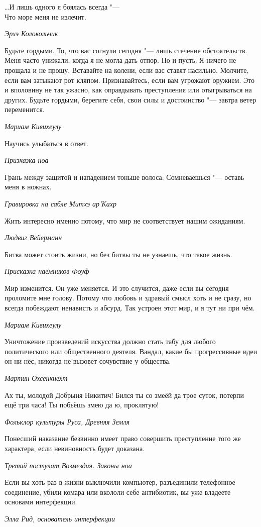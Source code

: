 \documentclass[a4paper,10pt,fleqn]{book}
\newcommand{\mulang}[3]{#2}%
\begin{document}
\epigraph{\dots И лишь одного я боялась всегда "---\\
Что море меня не излечит.}
{\textit{Эрхэ Колокольчик}}

\epigraph{Будьте гордыми.
То, что вас согнули сегодня "--- лишь стечение обстоятельств.
Меня часто унижали, когда я не могла дать отпор.
Но и пусть.
Я ничего не прощала и не прощу.
Вставайте на колени, если вас ставят насильно.
Молчите, если вам затыкают рот кляпом.
Признавайтесь, если вам угрожают оружием.
Это и вполовину не так ужасно, как оправдывать преступления или отыгрываться на других.
Будьте гордыми, берегите себя, свои силы и достоинство "--- завтра ветер переменится.}
{\textit{Мариам Кивихеулу}}

\epigraph{Научись улыбаться в ответ.}
{\textit{Призказка ноа}}

\epigraph{Грань между защитой и нападением тоньше волоса.
Сомневаешься "--- оставь меня в ножнах.}
{\textit{Гравировка на сабле Митхэ ар'Кахр}}

\epigraph{Жить интересно именно потому, что мир не соответствует нашим ожиданиям.}
{\textit{Людвиг Вейерманн}}

\epigraph{\mulang{}{Битва может стоить жизни, но без битвы ты не узнаешь, что такое жизнь.}
{Battle may take your life, but escaping battle you'll never know what life is.}}
{\textit{Присказка наёмников Фоуф}}

\epigraph{Мир изменится.
Он уже меняется.
И это случится, даже если вы сегодня проломите мне голову.
Потому что любовь и здравый смысл хоть и не сразу, но всегда побеждают ненависть и абсурд.
Так устроен этот мир, и я тут ни при чём.}
{\textit{Мариам Кивихеулу}}

\epigraph{Уничтожение произведений искусства должно стать табу для любого политического или общественного деятеля.
Вандал, какие бы прогрессивные идеи он ни нёс, никогда не вызовет сочувствие у общества.}
{\textit{Мартин Охсенкнехт}}

\epigraph{Ах ты, молодой Добрыня Никитич!
Бился ты со змеёй да трое суток, потерпи ещё три часа!
Ты побьёшь змею да ю, проклятую!}
{\textit{Фольклор культуры Руса, Древняя Земля}}

\epigraph{Понесший наказание безвинно имеет право совершить преступление того же характера, если невиновность будет доказана.}
{\textit{Третий постулат Возмездия. Законы ноа}}

\epigraph{Если вы хоть раз в жизни выключили компьютер, разъединили телефонное соединение, убили комара или вкололи себе антибиотик, вы уже владеете основами интерфекции.}
{\textit{Элла Рид, основатель интерфекции}}
\end{document}
